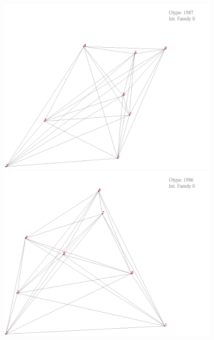 \documentclass[11pt,epsf,times,letterpaper]{article}
\begin{document}
	\begin{figure}
		\includegraphics[scale=.4]{if_tam0_tam1/23.png}
		\includegraphics[scale=.4]{if_tam0_tam1/24.png}
	\end{figure}
	
\end{document}
